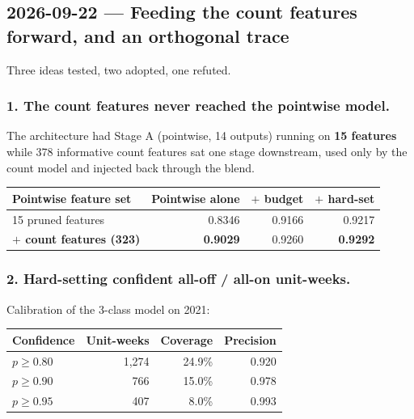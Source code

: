 \subsection{2026-09-22 --- Feeding the count features forward, and an orthogonal trace}
\label{sec:orthogonal}

Three ideas tested, two adopted, one refuted.

\subsubsection*{1. The count features never reached the pointwise model.}
The architecture had Stage A (pointwise, 14 outputs) running on \textbf{15 features} while 378
informative count features sat one stage downstream, used only by the count model and injected
back through the blend.

\begin{center}
\begin{tabular}{lrrr}
\toprule
Pointwise feature set & Pointwise alone & $+$ budget & $+$ hard-set \\
\midrule
15 pruned features            & 0.8346 & 0.9166 & 0.9217 \\
\textbf{$+$ count features (323)} & \textbf{0.9029} & 0.9260 & \textbf{0.9292} \\
\bottomrule
\end{tabular}
\end{center}


\subsubsection*{2. Hard-setting confident all-off / all-on unit-weeks.}
Calibration of the 3-class model on 2021:

\begin{center}
\begin{tabular}{lrrr}
\toprule
Confidence & Unit-weeks & Coverage & Precision \\
\midrule
$p \ge 0.80$ & 1{,}274 & 24.9\% & 0.920 \\
$p \ge 0.90$ & 766 & 15.0\% & 0.978 \\
$p \ge 0.95$ & 407 & 8.0\% & 0.993 \\
\bottomrule
\end{tabular}
\end{center}

